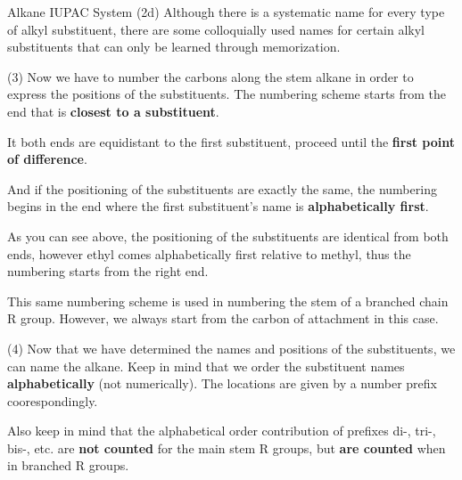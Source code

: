 \documentclass[10pt]{article}
\begin{document}
\begin{core}{Alkane IUPAC System}
      (2d) Although there is a systematic name for every type of alkyl substituent, there are some colloquially used names for certain alkyl substituents that can only be learned through memorization.


      (3) Now we have to number the carbons along the stem alkane in order to express the positions of the substituents. The numbering scheme starts from the end that is \textbf{closest to a substituent}.
      
      
      It both ends are equidistant to the first substituent, proceed until the \textbf{first point of difference}.
      
      
      And if the positioning of the substituents are exactly the same, the numbering begins in the end where the first substituent's name is \textbf{alphabetically first}.


      As you can see above, the positioning of the substituents are identical from both ends, however ethyl comes alphabetically first relative to methyl, thus the numbering starts from the right end. 

      This same numbering scheme is used in numbering the stem of a branched chain R group. However, we always start from the carbon of attachment in this case. 


      (4) Now that we have determined the names and positions of the substituents, we can name the alkane. Keep in mind that we order the substituent names \textbf{alphabetically} (not numerically). The locations are given by a number prefix coorespondingly.


      Also keep in mind that the alphabetical order contribution of prefixes di-, tri-, bis-, etc. are \textbf{not counted} for the main stem R groups, but \textbf{are counted} when in branched R groups.


    \end{core}
\end{document}
